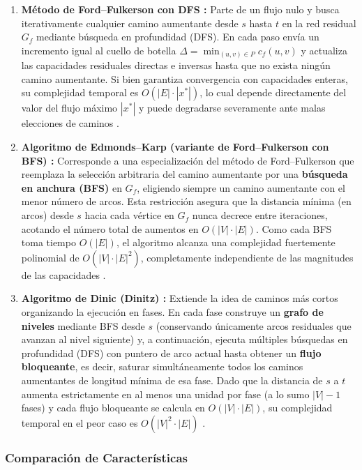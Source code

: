 \documentclass[11pt,a4paper]{article}
\begin{document}
\begin{enumerate}
    \item \textbf{Método de Ford--Fulkerson con DFS \cite{ford1956}:} Parte de un flujo nulo y busca iterativamente cualquier camino aumentante desde $s$ hasta $t$ en la red residual $G_f$ mediante búsqueda en profundidad (DFS). En cada paso envía un incremento igual al cuello de botella $\Delta = \min_{(u,v) \in P} c_f(u, v)$ y actualiza las capacidades residuales directas e inversas hasta que no exista ningún camino aumentante. Si bien garantiza convergencia con capacidades enteras, su complejidad temporal es $O(|E| \cdot |x^*|)$, lo cual depende directamente del valor del flujo máximo $|x^*|$ y puede degradarse severamente ante malas elecciones de caminos \cite{cormen}.

    \item \textbf{Algoritmo de Edmonds--Karp (variante de Ford--Fulkerson con BFS) \cite{edmonds1972}:} Corresponde a una especialización del método de Ford--Fulkerson que reemplaza la selección arbitraria del camino aumentante por una \textbf{búsqueda en anchura (BFS)} en $G_f$, eligiendo siempre un camino aumentante con el menor número de arcos. Esta restricción asegura que la distancia mínima (en arcos) desde $s$ hacia cada vértice en $G_f$ nunca decrece entre iteraciones, acotando el número total de aumentos en $O(|V| \cdot |E|)$. Como cada BFS toma tiempo $O(|E|)$, el algoritmo alcanza una complejidad fuertemente polinomial de $O(|V| \cdot |E|^2)$, completamente independiente de las magnitudes de las capacidades \cite{edmonds1972,cormen}.

    \item \textbf{Algoritmo de Dinic (Dinitz) \cite{dinic1970}:} Extiende la idea de caminos más cortos organizando la ejecución en fases. En cada fase construye un \textbf{grafo de niveles} mediante BFS desde $s$ (conservando únicamente arcos residuales que avanzan al nivel siguiente) y, a continuación, ejecuta múltiples búsquedas en profundidad (DFS) con puntero de arco actual hasta obtener un \textbf{flujo bloqueante}, es decir, saturar simultáneamente todos los caminos aumentantes de longitud mínima de esa fase. Dado que la distancia de $s$ a $t$ aumenta estrictamente en al menos una unidad por fase (a lo sumo $|V| - 1$ fases) y cada flujo bloqueante se calcula en $O(|V| \cdot |E|)$, su complejidad temporal en el peor caso es $O(|V|^2 \cdot |E|)$ \cite{dinic1970,ahuja}.
\end{enumerate}

\subsubsection{Comparación de Características}
\end{document}
